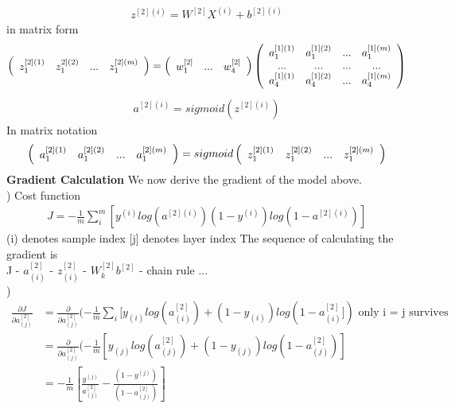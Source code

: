 \documentclass[a4paper]{article}
\begin{document}
\begin{align*}
	z^{[2](i)} = W^{[2]} X^{(i)} + b^{[2](i)}
\end{align*}
in matrix form
\begin{align*}
\left( \begin{array} {c c c c}
z_1^{[2](1)} & z_1^{2](2)} & ... & z_1^{[2](m)} \\
\end{array} \right)
=\left( \begin{array} {c c c}
w_{1}^{[2]} & ... &   w_{4}^{[2]}\\
\end{array} \right)
\left( \begin{array} {c c c c}
a_1^{[1](1)} & a_1^{[1](2)} & ... & a_1^{[1](m)} \\
...&...&...&...\\
a_4^{[1](1)} & a_4^{[1](2)} & ... & a_4^{[1](m)} \\
\end{array} \right)\\
\end{align*}
\begin{align*}
	a^{[2](i)} = sigmoid(z^{[2](i)})
\end{align*}
In matrix notation
\begin{align*}
\left( \begin{array} {c c c c}
a_1^{[2](1)} & a_1^{[2](2)} & ... & a_1^{[2](m)} \\
\end{array} \right)
=sigmoid \left( \begin{array} {c c c c}
z_1^{[2](1)} & z_1^{[2](2)} & ... & z_1^{[2](m)} \\
\end{array} \right)
\end{align*}
{\bf Gradient Calculation}
We now derive the gradient of the model above.\\
) Cost function\\
\begin{align*}
	J = -\frac{1}{m} \sum_i^m[y^{(i)} log(a^{[2](i)})
	(1-y^{(i)}) log(1 - a^{[2](i)})]
\end{align*}
(i) denotes sample index
[j] denotes layer index
The sequence of calculating the gradient is \\
J - $a_{(i)}^{[2]}$ - $z_{(i)}^{[2]}$ - $W_k^{[2]} b^{[2]}$ - chain rule ...\\
) \\
\begin{align*}
\frac{\partial J}{\partial a_{(j)}^{[2]}}
& = \frac{\partial }{\partial a_{(j)}^{[2]}} (-\frac{1}{m} \sum_i [y_{(i)} log(a^{[2]}_{(i)})
	+ (1-y_{(i)}) log(1 - a^{[2]}_{(i)}]) \textrm{ only i = j survives}\\
& = \frac{\partial }{\partial a_{(j)}^{[2]}} (-\frac{1}{m}  [y_{(j)} log(a^{[2]}_{(j)})
	+ (1-y_{(j)}) log(1 - a^{[2]}_{(j)})]\\
& = -\frac{1}{m}  [\frac{y^{(j)}}{ a^{[2]}_{(j)}}
	-\frac{(1-y^{(j)})}{ (1 - a^{[2]}_{(j)})}]\\
\end{align*}
\end{document}
